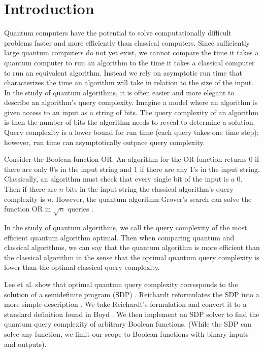 \section{Introduction}

Quantum computers have the potential to 
solve computationally difficult problems
faster and more efficiently than classical computers.
Since sufficiently large quantum computers do not yet exist,
we cannot compare the time it takes a quantum computer
to run an algorithm to the time it takes a classical computer
to run an equivalent algorithm.
Instead we rely on asymptotic run time that 
characterizes the time an algorithm will take in relation
to the size of the input.
In the study of quantum algorithms, it is often easier
and more elegant to describe an algorithm's query complexity.
Imagine a model where an algorithm is given access
to an input as a string of bits.
The query complexity of an algorithm is then the number
of bits the algorithm needs to reveal to determine a solution.
Query complexity is a lower bound for run time
(each query takes one time step);
however, run time can asymptotically outpace query complexity.

Consider the Boolean function OR.
An algorithm for the OR function returns 0 if
there are only 0's in the input string
and 1 if there are any 1's in the input string.
Classically, an algorithm must check that
every single bit of the input is a 0.
Then if there are $n$ bits in the input string
the classical algorithm's query complexity is $n$.
However, the quantum algorithm Grover's search
can solve the function OR in $\sqrt{n}$ queries \cite{grover1996fast}.

In the study of quantum algorithms,
we call the query complexity of the most efficient quantum
algorithm optimal.
Then when comparing quantum and classical algorithms,
we can say that the quantum algorithm is more
efficient than the classical algorithm in the sense
that the optimal quantum query complexity
is lower than the optimal classical query complexity.

Lee et al. show that optimal quantum query complexity
corresponds to the solution of a semidefinite program (SDP)
\cite{lee2011quantum}.
Reichardt reformulates the SDP into a more simple description 
\cite{reichardt2009span}.
We take Reichardt's formulation and convert it
to a standard definition found in Boyd \cite{boyd2004convex}.
We then implement an SDP solver to find the
quantum query complexity of arbitrary Boolean functions.
(While the SDP can solve any function,
we limit our scope to Boolean functions with
binary inputs and outputs).

